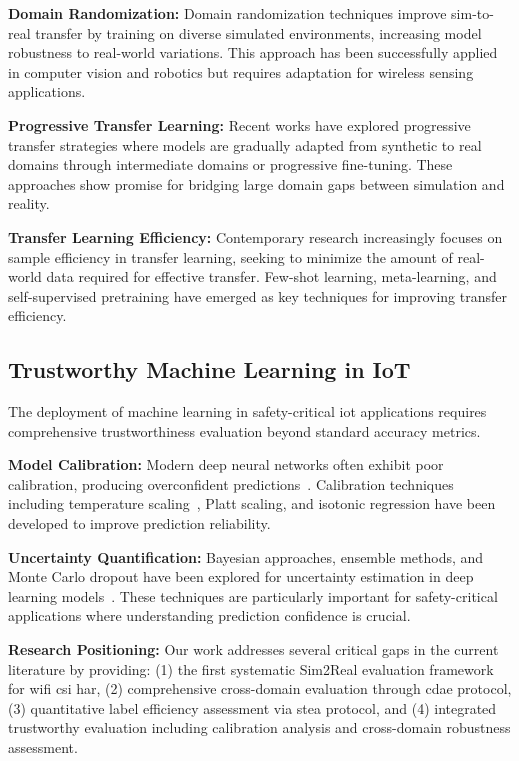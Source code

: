 \documentclass[journal]{IEEEtran}
\begin{document}
\textbf{Domain Randomization:} Domain randomization techniques improve sim-to-real transfer by training on diverse simulated environments, increasing model robustness to real-world variations. This approach has been successfully applied in computer vision and robotics but requires adaptation for wireless sensing applications.

\textbf{Progressive Transfer Learning:} Recent works have explored progressive transfer strategies where models are gradually adapted from synthetic to real domains through intermediate domains or progressive fine-tuning. These approaches show promise for bridging large domain gaps between simulation and reality.

\textbf{Transfer Learning Efficiency:} Contemporary research increasingly focuses on sample efficiency in transfer learning, seeking to minimize the amount of real-world data required for effective transfer. Few-shot learning, meta-learning, and self-supervised pretraining have emerged as key techniques for improving transfer efficiency.

\subsection{Trustworthy Machine Learning in IoT}

The deployment of machine learning in safety-critical \gls{iot} applications requires comprehensive trustworthiness evaluation beyond standard accuracy metrics.

\textbf{Model Calibration:} Modern deep neural networks often exhibit poor calibration, producing overconfident predictions~\cite{calibration_guo2017}. Calibration techniques including temperature scaling~\cite{temperature_scaling2017}, Platt scaling, and isotonic regression have been developed to improve prediction reliability.

\textbf{Uncertainty Quantification:} Bayesian approaches, ensemble methods, and Monte Carlo dropout have been explored for uncertainty estimation in deep learning models~\cite{reliability_assessment2019}. These techniques are particularly important for safety-critical applications where understanding prediction confidence is crucial.

\textbf{Research Positioning:} Our work addresses several critical gaps in the current literature by providing: (1) the first systematic Sim2Real evaluation framework for \gls{wifi} \gls{csi} \gls{har}, (2) comprehensive cross-domain evaluation through \gls{cdae} protocol, (3) quantitative label efficiency assessment via \gls{stea} protocol, and (4) integrated trustworthy evaluation including calibration analysis and cross-domain robustness assessment.
\end{document}
